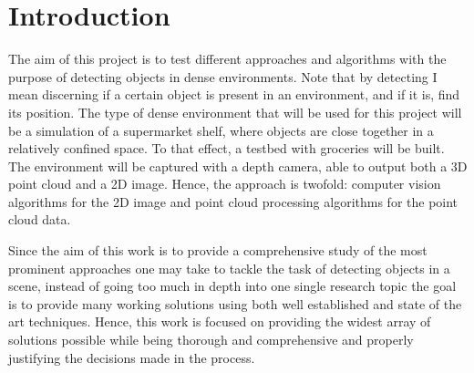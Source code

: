 \documentclass[../main.tex]{subfiles}
\begin{document}
\section{Introduction}
The aim of this project is to test different approaches and algorithms with the purpose of detecting objects in dense environments. Note that by detecting I mean discerning if a certain object is present in an environment, and if it is, find its position. The type of dense environment that will be used for this project will be a simulation of a supermarket shelf, where objects are close together in a relatively confined space. To that effect, a testbed with groceries will be built. The environment will be captured with a depth camera, able to output both a 3D point cloud and a 2D image. Hence, the approach is twofold: computer vision algorithms for the 2D image and point cloud processing algorithms for the point cloud data.

Since the aim of this work is to provide a comprehensive study of the most prominent approaches one may take to tackle the task of detecting objects in a scene, instead of going too much in depth into one single research topic the goal is to provide many working solutions using both well established and state of the art techniques. Hence, this work is focused on providing the widest array of solutions possible while being thorough and comprehensive and properly justifying the decisions made in the process.
\end{document}
